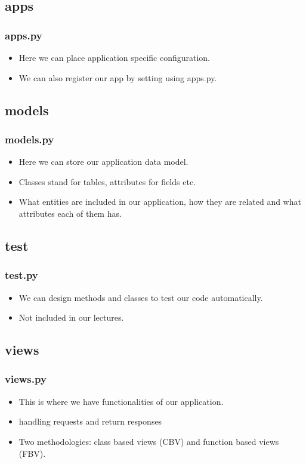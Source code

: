 \documentclass{beamer}
\begin{document}
\subsection{apps}
\begin{frame}
\frametitle{apps.py}
	
	\begin{itemize}
		\item Here we can place application specific configuration.
		\item We can also register our app by setting using apps.py.
	\end{itemize}
\end{frame}

\subsection{models}
\begin{frame}
	\frametitle{models.py}
	\begin{itemize}
		\item Here we can store our application data model.
		\item Classes stand for tables, attributes for fields etc.
		\item What entities are included in our application, how they are related and what attributes each of them has.
	\end{itemize}
\end{frame}

\subsection{test}
\begin{frame}
	\frametitle{test.py}
	\begin{itemize}
		\item We can design methods and classes to test our code automatically.
		\item Not included in our lectures.
	\end{itemize}
\end{frame}

\subsection{views}
\begin{frame}
	\frametitle{views.py}
	\begin{itemize}
		\item This is where we have functionalities of our application.
		\item handling requests and return responses
		\item Two methodologies: class based views (CBV) and function based views (FBV).
	\end{itemize}
\end{frame}
\end{document}
